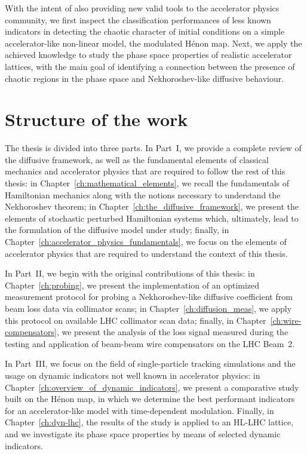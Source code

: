With the intent of also providing new valid tools to the accelerator physics community, we first inspect the classification performances of less known indicators in detecting the chaotic character of initial conditions on a simple accelerator-like non-linear model, the modulated Hénon map. Next, we apply the achieved knowledge to study the phase space properties of realistic accelerator lattices, with the main goal of identifying a connection between the presence of chaotic regions in the phase space and Nekhoroshev-like diffusive behaviour.

\section*{Structure of the work}

The thesis is divided into three parts. In Part~I, we provide a complete review of the diffusive framework, as well as the fundamental elements of classical mechanics and accelerator physics that are required to follow the rest of this thesis: in Chapter~\ref{ch:mathematical_elements}, we recall the fundamentals of Hamiltonian mechanics along with the notions necessary to understand the Nekhoroshev theorem; in Chapter~\ref{ch:the_diffusive_framework}, we present the elements of stochastic perturbed Hamiltonian systems which, ultimately, lead to the formulation of the diffusive model under study; finally, in Chapter~\ref{ch:accelerator_physics_fundamentals}, we focus on the elements of accelerator physics that are required to understand the context of this thesis.

In Part~II, we begin with the original contributions of this thesis: in Chapter~\ref{ch:probing}, we present the implementation of an optimized measurement protocol for probing a Nekhoroshev-like diffusive coefficient from beam loss data via collimator scans; in Chapter~\ref{ch:diffusion_meas}, we apply this protocol on available LHC collimator scan data; finally, in Chapter~\ref{ch:wire-compensators}, we present the analysis of the loss signal measured during the testing and application of beam-beam wire compensators on the LHC Beam~2.

In Part~III, we focus on the field of single-particle tracking simulations and the usage on dynamic indicators not well known in accelerator physics: in Chapter~\ref{ch:overview_of_dynamic_indicators}, we present a comparative study built on the Hénon map, in which we determine the best performant indicators for an accelerator-like model with time-dependent modulation. Finally, in Chapter~\ref{ch:dyn-lhc}, the results of the study is applied to an HL-LHC lattice, and we investigate its phase space properties by means of selected dynamic indicators.


